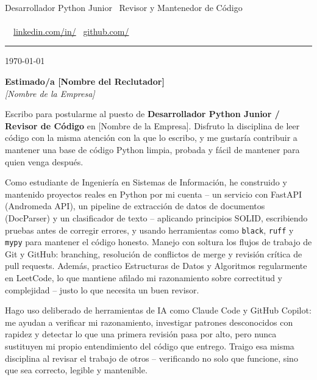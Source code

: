 \documentclass[11pt]{article}
\begin{document}
{\color{cvprimary}\Huge\bfseries \MyName}\\[2pt]
{\color{cvaccent}\large Desarrollador Python Junior \textbullet\ Revisor y Mantenedor de C\'odigo}\\[6pt]
{\small\color{cvlight}%
  \faMapMarker* \, \MyLocation \quad\textbullet\quad
  \faPhone* \, \MyPhone \\[2pt]
  \faEnvelope \, \href{mailto:\MyEmail}{\MyEmail} \quad\textbullet\quad
  \faLinkedin \, \href{\MyLinkedInURL}{linkedin.com/in/\MyLinkedIn} \quad\textbullet\quad
  \faGithub \, \href{\MyGitHubURL}{github.com/\MyGitHub}%
}\\[-2pt]
{\color{cvaccent}\rule{\linewidth}{1.2pt}}

\vspace{10pt}
{\color{cvlight}\small \today}

\vspace{8pt}
{\color{cvprimary}\bfseries Estimado/a [Nombre del Reclutador]}\\
{\itshape [Nombre de la Empresa]}

\vspace{12pt}
Escribo para postularme al puesto de \textbf{Desarrollador Python Junior / Revisor de
C\'odigo} en [Nombre de la Empresa]. Disfruto la disciplina de leer c\'odigo con la misma
atenci\'on con la que lo escribo, y me gustar\'ia contribuir a mantener una base de c\'odigo
Python limpia, probada y f\'acil de mantener para quien venga despu\'es.

Como estudiante de Ingenier\'ia en Sistemas de Informaci\'on, he construido y mantenido
proyectos reales en Python por mi cuenta -- un servicio con FastAPI (Andromeda API), un
pipeline de extracci\'on de datos de documentos (DocParser) y un clasificador de texto --
aplicando principios SOLID, escribiendo pruebas antes de corregir errores, y usando
herramientas como \texttt{black}, \texttt{ruff} y \texttt{mypy} para mantener el c\'odigo
honesto. Manejo con soltura los flujos de trabajo de Git y GitHub: branching, resoluci\'on de
conflictos de merge y revisi\'on cr\'itica de pull requests. Adem\'as, practico Estructuras de
Datos y Algoritmos regularmente en LeetCode, lo que mantiene afilado mi razonamiento sobre
correctitud y complejidad -- justo lo que necesita un buen revisor.

Hago uso deliberado de herramientas de IA como Claude Code y GitHub Copilot: me ayudan a
verificar mi razonamiento, investigar patrones desconocidos con rapidez y detectar lo que una
primera revisi\'on pasa por alto, pero nunca sustituyen mi propio entendimiento del c\'odigo
que entrego. Traigo esa misma disciplina al revisar el trabajo de otros -- verificando no
solo que funcione, sino que sea correcto, legible y mantenible.
\end{document}
